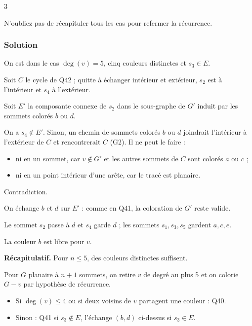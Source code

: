 \documentclass[11pt,a4paper]{article}
\providecommand{\tightlist}{\setlength{\itemsep}{0pt}\setlength{\parskip}{0pt}}
\begin{document}
\begin{indication}{3}

N'oubliez pas de récapituler tous les cas pour refermer la récurrence.

\end{indication}

\hypertarget{solution-42}{%
\subsubsection{Solution}\label{solution-42}}

On est dans le cas \(\deg(v) = 5\), cinq couleurs distinctes et \(s_3 \in E\).

Soit \(C\) le cycle de Q42 ; quitte à échanger intérieur et extérieur, \(s_2\) est à l'intérieur et \(s_4\) à l'extérieur.

Soit \(E'\) la composante connexe de \(s_2\) dans le sous-graphe de \(G'\) induit par les sommets colorés \(b\) ou \(d\).

On a \(s_4 \notin E'\). Sinon, un chemin de sommets colorés \(b\) ou \(d\) joindrait l'intérieur à l'extérieur de \(C\) et rencontrerait \(C\) (G2). Il ne peut le faire :

\begin{itemize}
\tightlist
\item
  ni en un sommet, car \(v \notin G'\) et les autres sommets de \(C\) sont colorés \(a\) ou \(c\) ;
\item
  ni en un point intérieur d'une arête, car le tracé est planaire.
\end{itemize}

Contradiction.

On échange \(b\) et \(d\) sur \(E'\) : comme en Q41, la coloration de \(G'\) reste valide.

Le sommet \(s_2\) passe à \(d\) et \(s_4\) garde \(d\) ; les sommets \(s_1, s_3, s_5\) gardent \(a, c, e\).

La couleur \(b\) est libre pour \(v\).

\textbf{Récapitulatif.} Pour \(n \le 5\), des couleurs distinctes suffisent.

Pour \(G\) planaire à \(n + 1\) sommets, on retire \(v\) de degré au plus 5 et on colorie \(G - v\) par hypothèse de récurrence.

\begin{itemize}
\tightlist
\item
  Si \(\deg(v) \le 4\) ou si deux voisins de \(v\) partagent une couleur : Q40.
\item
  Sinon : Q41 si \(s_3 \notin E\), l'échange \((b, d)\) ci-dessus si \(s_3 \in E\).
\end{itemize}
\end{document}
